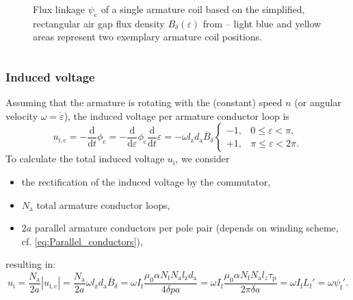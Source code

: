 \begin{frame}
\begin{columns}
\begin{column}{0.50\textwidth}
\begin{figure}
			\caption{Flux linkage $\psi_\mathrm{c}$ of a single armature coil based on the simplified, rectangular air gap flux density $B_\delta(\varepsilon)$  from  -- light blue and yellow areas represent two exemplary armature coil positions.}
			\label{fig:Flux_density_and_linkage}
		\end{figure}
	\end{column}
	\end{columns}
\end{frame}

\begin{frame}
	\frametitle{Induced voltage}
	Assuming that the armature is rotating with the (constant) speed $n$ (or angular velocity $\omega = \dot{\varepsilon}$), the induced voltage per armature conductor loop is
	\begin{equation}
			u_\mathrm{i,c} = - \frac{\mathrm{d}}{\mathrm{d}t} \phi_\mathrm{c} = - \frac{\mathrm{d}}{\mathrm{d}\varepsilon} \phi_\mathrm{c} \frac{\mathrm{d}}{\mathrm{d}t}\varepsilon = - \omega l_\mathrm{z}d_\mathrm{a}\overline{B}_\delta \begin{cases}
				-1, &  0 \leq \varepsilon < \pi,\\
				+1, &  \pi \leq \varepsilon < 2\pi.
			\end{cases}
		\label{eq:Induced_voltage_per_conductor}
	\end{equation}
	To calculate the total induced voltage $u_\mathrm{i}$, we consider
	\begin{itemize}
	   \item the rectification of the induced voltage by the commutator, \pause 		
	   \item $N_\mathrm{a}$ total armature conductor loops, \pause
	   \item $2 a$ parallel armature conductors per pole pair (depends on winding scheme, cf. \eqref{eq:Parallel_conductors}), \pause
	\end{itemize}
	resulting in: 
	\begin{equation}
			u_\mathrm{i} = \frac{N_\mathrm{a}}{2 a} |u_\mathrm{i,c}| = \frac{N_\mathrm{a}}{2 a}\omega l_\mathrm{z}d_\mathrm{a}\overline{B}_\delta = \omega I_\mathrm{f}\frac{\mu_0 \alpha N_\mathrm{f} N_\mathrm{a} l_\mathrm{z} d_\mathrm{a}}{4 \delta p a} =  \omega I_\mathrm{f} \frac{\mu_0 \alpha N_\mathrm{f} N_\mathrm{a} l_z \tau_\mathrm{p}}{2 \pi  \delta a} =\omega I_\mathrm{f} L_\mathrm{f}' = \omega  \psi_\mathrm{f}'.
	\end{equation}
\end{frame}


